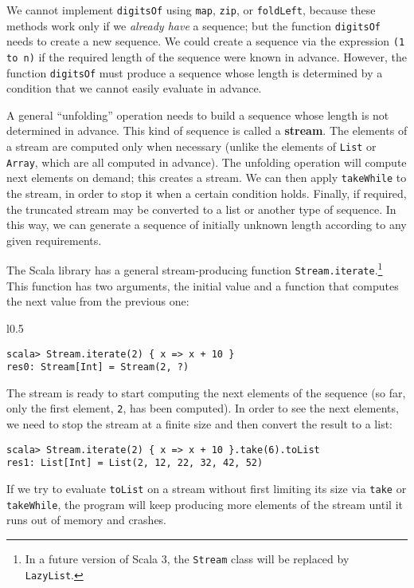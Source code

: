 \noindent We cannot implement \lstinline!digitsOf! using \lstinline!map!,
\lstinline!zip!, or \lstinline!foldLeft!, because these methods
work only if we \emph{already have} a sequence; but the function \lstinline!digitsOf!
needs to create a new sequence. We could create a sequence via the
expression \lstinline!(1 to n)! if the required length of the sequence
were known in advance. However, the function \lstinline!digitsOf!
must produce a sequence whose length is determined by a condition
that we cannot easily evaluate in advance.

A general \textsf{``}unfolding\textsf{''} operation needs to build a sequence whose
length is not determined in advance. This kind of sequence is called
a \textbf{stream}. The elements of a stream are computed
only when necessary (unlike the elements of \lstinline!List! or \lstinline!Array!,
which are all computed in advance). The unfolding operation will compute
next elements on demand; this creates a stream. We can then apply
\lstinline!takeWhile! to the stream, in order to stop it when a certain
condition holds. Finally, if required, the truncated stream may be
converted to a list or another type of sequence. In this way, we can
generate a sequence of initially unknown length according to any given
requirements.

The Scala library has a general stream-producing function \lstinline!Stream.iterate!.\footnote{In a future version of Scala 3, the \lstinline!Stream! class will
be replaced by \lstinline!LazyList!.} This function has two arguments, the initial value and a function
that computes the next value from the previous one:

\begin{wrapfigure}{l}{0.5\columnwidth}%
\vspace{-0.7\baselineskip}
\begin{lstlisting}
scala> Stream.iterate(2) { x => x + 10 }
res0: Stream[Int] = Stream(2, ?)
\end{lstlisting}

\vspace{-1\baselineskip}
\end{wrapfigure}%

\noindent The stream is ready to start computing the next elements
of the sequence (so far, only the first element, \lstinline!2!, has
been computed). In order to see the next elements, we need to stop
the stream at a finite size and then convert the result to a list:
\begin{lstlisting}
scala> Stream.iterate(2) { x => x + 10 }.take(6).toList
res1: List[Int] = List(2, 12, 22, 32, 42, 52)
\end{lstlisting}
If we try to evaluate \lstinline!toList! on a stream without first
limiting its size via \lstinline!take! or \lstinline!takeWhile!,
the program will keep producing more elements of the stream until
it runs out of memory and crashes.

